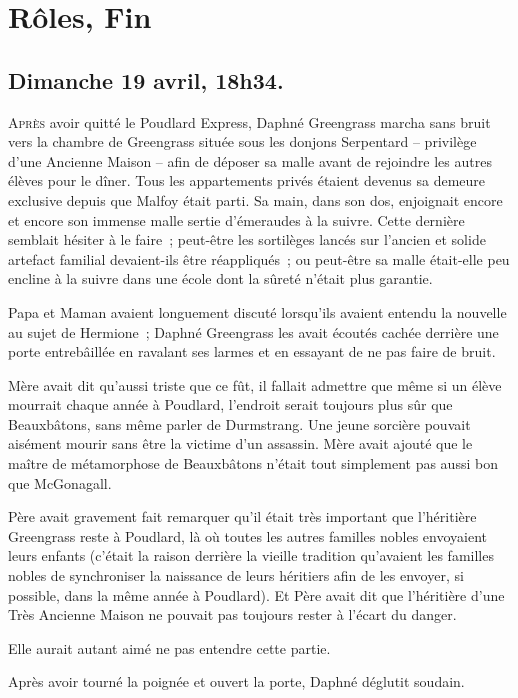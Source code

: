 \chapter{Rôles, Fin}

\section{Dimanche 19 avril, 18h34.}

\lettrine{A}{près} avoir quitté le Poudlard Express, Daphné Greengrass marcha sans bruit vers la chambre de Greengrass située sous les donjons Serpentard -- privilège d'une Ancienne Maison -- afin de déposer sa malle avant de rejoindre les autres élèves pour le dîner.
Tous les appartements privés étaient devenus sa demeure exclusive depuis que Malfoy était parti.
Sa main, dans son dos, enjoignait encore et encore son immense malle sertie d'émeraudes à la suivre.
Cette dernière semblait hésiter à le faire~; peut-être les sortilèges lancés sur l'ancien et solide artefact familial devaient-ils être réappliqués~; ou peut-être sa malle était-elle peu encline à la suivre dans une école dont la sûreté n'était plus garantie.

Papa et Maman avaient longuement discuté lorsqu'ils avaient entendu la nouvelle au sujet de Hermione~; Daphné Greengrass les avait écoutés cachée derrière une porte entrebâillée en ravalant ses larmes et en essayant de ne pas faire de bruit.

Mère avait dit qu'aussi triste que ce fût, il fallait admettre que même si un élève mourrait chaque année à Poudlard, l'endroit serait toujours plus sûr que Beauxbâtons, sans même parler de Durmstrang.
Une jeune sorcière pouvait aisément mourir sans être la victime d'un assassin.
Mère avait ajouté que le maître de métamorphose de Beauxbâtons n'était tout simplement pas aussi bon que McGonagall.

Père avait gravement fait remarquer qu'il était très important que l'héritière Greengrass reste à Poudlard, là où toutes les autres familles nobles envoyaient leurs enfants (c'était la raison derrière la vieille tradition qu'avaient les familles nobles de synchroniser la naissance de leurs héritiers afin de les envoyer, si possible, dans la même année à Poudlard).
Et Père avait dit que l'héritière d'une Très Ancienne Maison ne pouvait pas toujours rester à l'écart du danger.

Elle aurait autant aimé ne pas entendre cette partie.

Après avoir tourné la poignée et ouvert la porte, Daphné déglutit soudain.

